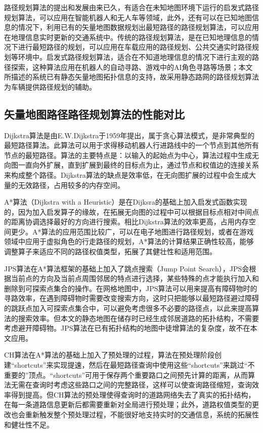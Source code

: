 路径规划算法的提出和发展由来已久，有适合在未知地图环境下运行的启发式路径规划算法，可以应用在智能机器人和无人车等领域，此外，还有可以在已知地图信息的情况下，利用已有的矢量地图数据规划出最短路径的路径规划算法，可以应用在地理信息实时更新的交通系统中。传统的路径规划算法，是在已知地理信息的情况下进行最短路径的规划，可以应用在车载应用的路径规划、公共交通实时路径规划等环境中。启发式路径规划算法，适合在不知道地理信息的情况下进行主观的路径探索，这种算法应用在机器人的自动寻路、游戏中的AI角色寻路等场景；本文所描述的系统已有静态矢量地图拓扑信息的支持，故采用静态路网的路径规划算法为车辆提供路径规划的辅助。

\subsection{矢量地图路径路径规划算法的性能对比}

Dijkstra算法是由E.W.Dijkstra于1959年提出，属于贪心算法模式，是非常典型的最短路径算法。此算法可以用于求得移动机器人行进路线中的一个节点到其他所有节点的最短路径。算法的主要特点是：以输入的起始点为中心，算法过程中生成无向图一直向外扩展，直到扩展到最终的目标点为止，通过节点和权值边的连接关系来构成整个路径。Dijkstra算法的缺点是效率低，在无向图扩展的过程中会生成大量的无效路径，占用较多的内存空间。

A*算法（Dijkstra with a Heuristic）是在Dijksra的基础上加入启发式函数实现的，因为加入启发算子的缘故，在拓展无向图的过程中可以根据目标点相对中间点的距离协调选择最好的方向进行搜索。相比Dijkstra算法的效率更高，占用内存空间更少。A*算法的应用范围比较广，可以在电子地图进行路径规划，或者在游戏领域中应用于虚拟角色的行走路径的规划，A*算法的计算结果正确性较高，能够调整算子来适应不同的路径权值类型，拓展了其健壮性和适用范围。

JPS算法在A*算法框架的基础上加入了跳点搜索（Jump Point Search），JPS会根据当前点的方向及当前点周围邻居的特点进行选择，某些特殊的点才能执行加入和删除到可探索点集合的操作。在网格地图中，JPS算法可以用来提高有障碍物时的寻路效率，在遇到障碍物时需要改变搜索方向，这时只把能够以最短路径避过障碍的跳跃点加入可探索点集合中，可以避免考虑很多不必要的路径点，以此来提高算法的搜索效率。但本文的静态地图在储存时已经生成邻居道路的拓扑结构，不需要考虑避开障碍物。JPS算法在已有拓扑结构的地图中徒增算法的复杂度，故不在本文应用。

CH算法在A*算法的基础上加入了预处理的过程，算法在预处理阶段创建“shortcuts”来实现提速，然后在最短路径查询中使用这些“shortcuts”来跳过“不重要的”顶点。“shortcuts”可用于保存两个重要路口之间预先计算的距离，从而算法无需在查询时考虑这些路口之间的完整路径，这样可以使查询路径缩短，查询效率得到提高。但CH算法的预处理使得查询时的道路网络失去了真实的拓扑结构，在每一条道路信息更新后都需要重新对全局进行预处理；此外，道路权值类型的更改也会重新触发整个预处理过程，不能很好地支持实时的交通信息，系统的拓展性和健壮性不足。

